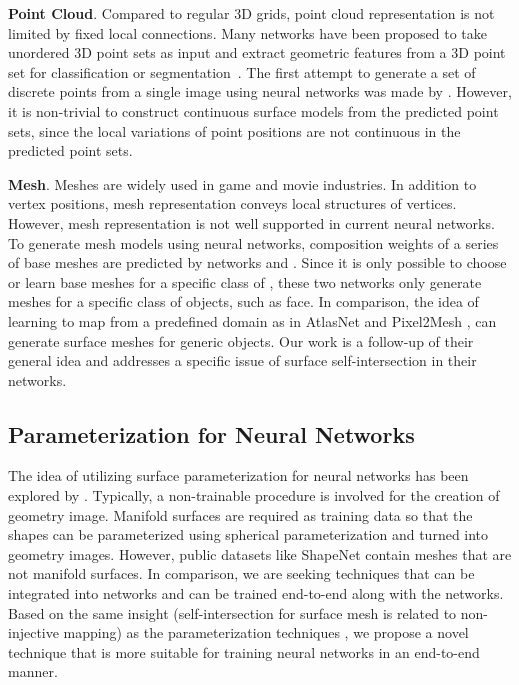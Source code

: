 \noindent\textbf{Point Cloud}. 
Compared to regular 3D grids, point cloud representation is not limited by fixed local connections.
Many networks have been proposed to take unordered 3D point sets as input and extract geometric features from a 3D point set for classification or segmentation~\cite{pointnet,NIPS2017_7095,pointcnn}.
%
The first attempt to generate a set of discrete points from a single image using neural networks was made by \cite{PSGN}. However, it is non-trivial to construct continuous surface models from the predicted point sets, since the local variations of point positions are not continuous in the predicted point sets.

\noindent\textbf{Mesh}.
Meshes are widely used in game and movie industries.
In addition to vertex positions, mesh representation conveys local structures of vertices. 
However, mesh representation is not well supported in current neural networks.
% 
To generate mesh models using neural networks, composition weights of a series of base meshes are predicted by networks \cite{img2mesh} and \cite{endface}. %
Since it is only possible to choose or learn base meshes for a specific class of , these two networks only generate meshes for a specific class of objects, such as face.
%
In comparison, the idea of learning to map from a predefined domain as in AtlasNet  \cite{atlasnet} and Pixel2Mesh \cite{pixel2mesh}, can generate surface meshes for generic objects. Our work is a follow-up of their general idea and addresses a specific issue of surface self-intersection in their networks.

\subsection{Parameterization for Neural Networks}
The idea of utilizing surface parameterization for neural networks has been explored by \cite{surfnet,geoimg}. 
Typically, a non-trainable procedure is involved for the creation of geometry image. 
Manifold surfaces are required as training data so that the shapes can be parameterized using spherical parameterization and turned into geometry images. However, public datasets like ShapeNet \cite{shapenetdata} contain meshes that are not manifold surfaces. 
In comparison, we are seeking techniques that can be integrated into networks and can be trained end-to-end along with the networks. Based on the same insight (self-intersection for surface mesh is related to non-injective mapping) as the parameterization techniques , we propose a novel technique that is more suitable for training neural networks in an end-to-end manner. 

